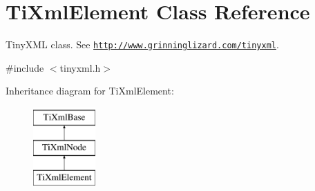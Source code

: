 \hypertarget{class_ti_xml_element}{}\section{Ti\+Xml\+Element Class Reference}
\label{class_ti_xml_element}


Tiny\+X\+ML class. See \href{http://www.grinninglizard.com/tinyxml}{\tt http\+://www.\+grinninglizard.\+com/tinyxml}.  




{\ttfamily \#include $<$tinyxml.\+h$>$}

Inheritance diagram for Ti\+Xml\+Element\+:\begin{figure}[H]
\begin{center}
\leavevmode
\includegraphics[height=3.000000cm]{class_ti_xml_element}
\end{center}
\end{figure}

